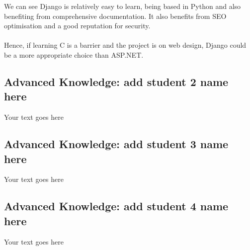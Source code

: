 \documentclass[a4paper, 11pt]{report}
\begin{document}
	We can see Django is relatively easy to learn, being based in Python and also benefiting from comprehensive documentation. It also benefits from SEO optimisation and a good reputation for security.
	\\
	\\Hence, if learning C is a barrier and the project is on web design, Django could be a more appropriate choice than ASP.NET.

	\subsection{Advanced Knowledge: add student 2 name here}

	Your text goes here

	\subsection{Advanced Knowledge: add student 3 name here}

	Your text goes here

	\subsection{Advanced Knowledge: add student 4 name here}

	Your text goes here




	\newpage

	
	
\end{document}

